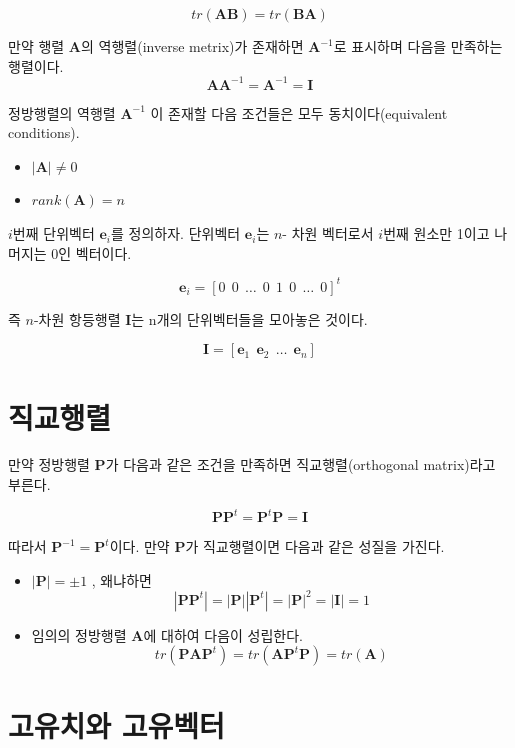 \documentclass[
]{book}
\providecommand{\tightlist}{%
  \setlength{\itemsep}{0pt}\setlength{\parskip}{0pt}}
\newcommand{\bm}[1]{\boldsymbol{\mathbf{#1}}}
\theoremstyle{definition}
\theoremstyle{definition}
\theoremstyle{definition}
\theoremstyle{definition}
\theoremstyle{remark}
\begin{document}
\[  tr(\bm A \bm B)  = tr( \bm B \bm A) \]

만약 행렬 \(\bm A\)의 역행렬(inverse metrix)가 존재하면 \(\bm A^{-1}\)로 표시하며 다음을 만족하는 행렬이다.
\[ \bm A \bm A^{-1} = \bm A^{-1} = \bm I \]

정방행렬의 역행렬 \(\bm A^{-1}\) 이 존재할 다음 조건들은 모두 동치이다(equivalent conditions).

\begin{itemize}
\tightlist
\item
  \(|\bm A| \ne 0\)
\item
  \(rank(\bm A) = n\)
\end{itemize}

\(i\)번째 단위벡터 \(\bm e_i\)를 정의하자. 단위벡터 \(\bm e_i\)는 \(n\)- 차원 벡터로서 \(i\)번째 원소만 1이고 나머지는 0인 벡터이다.

\[ \bm e_i = [0 ~~0 ~~\dots~~ 0 ~~ 1 ~~ 0 ~~ \dots ~~ 0 ]^t \]

즉 \(n\)-차원 항등행렬 \(\bm I\)는 n개의 단위벡터들을 모아놓은 것이다.

\[  \bm I = [ \bm e_1 ~~ \bm e_2 ~~ \dots ~~ \bm e_n ] \]

\hypertarget{uxc9c1uxad50uxd589uxb82c}{%
\section{직교행렬}\label{uxc9c1uxad50uxd589uxb82c}}

만약 정방행렬 \(\bm P\)가 다음과 같은 조건을 만족하면 직교행렬(orthogonal matrix)라고 부른다.

\[  \bm P \bm P^t = \bm P^t \bm P = \bm I \]

따라서 \(\bm P^{-1} = \bm P^t\)이다. 만약 \(\bm P\)가 직교행렬이면 다음과 같은 성질을 가진다.

\begin{itemize}
\item
  \(| \bm P | = \pm 1\) , 왜냐하면
  \[  | \bm P \bm P^t | = | \bm P | |\bm P^t |  = | \bm P|^2 = |\bm I| =1 \]
\item
  임의의 정방행렬 \(\bm A\)에 대하여 다음이 성립한다.
  \[ tr(\bm P \bm A \bm P^t) = tr(\bm A \bm P^t \bm P) = tr(\bm A) \]
\end{itemize}

\hypertarget{uxace0uxc720uxce58uxc640-uxace0uxc720uxbca1uxd130}{%
\section{고유치와 고유벡터}\label{uxace0uxc720uxce58uxc640-uxace0uxc720uxbca1uxd130}}
\end{document}
